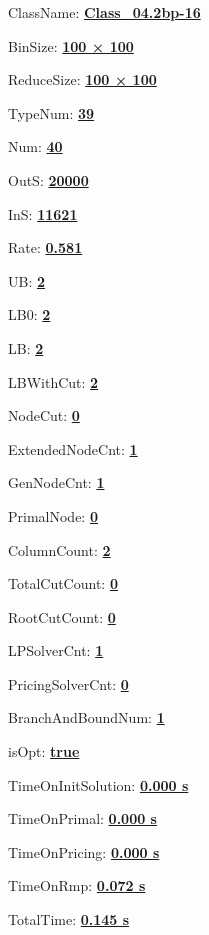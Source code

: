 \documentclass[11pt]{article}
\begin{document}
\pagestyle{empty}


ClassName: \underline{\textbf{Class_04.2bp-16}}
\par
BinSize: \underline{\textbf{100 × 100}}
\par
ReduceSize: \underline{\textbf{100 × 100}}
\par
TypeNum: \underline{\textbf{39}}
\par
Num: \underline{\textbf{40}}
\par
OutS: \underline{\textbf{20000}}
\par
InS: \underline{\textbf{11621}}
\par
Rate: \underline{\textbf{0.581}}
\par
UB: \underline{\textbf{2}}
\par
LB0: \underline{\textbf{2}}
\par
LB: \underline{\textbf{2}}
\par
LBWithCut: \underline{\textbf{2}}
\par
NodeCut: \underline{\textbf{0}}
\par
ExtendedNodeCnt: \underline{\textbf{1}}
\par
GenNodeCnt: \underline{\textbf{1}}
\par
PrimalNode: \underline{\textbf{0}}
\par
ColumnCount: \underline{\textbf{2}}
\par
TotalCutCount: \underline{\textbf{0}}
\par
RootCutCount: \underline{\textbf{0}}
\par
LPSolverCnt: \underline{\textbf{1}}
\par
PricingSolverCnt: \underline{\textbf{0}}
\par
BranchAndBoundNum: \underline{\textbf{1}}
\par
isOpt: \underline{\textbf{true}}
\par
TimeOnInitSolution: \underline{\textbf{0.000 s}}
\par
TimeOnPrimal: \underline{\textbf{0.000 s}}
\par
TimeOnPricing: \underline{\textbf{0.000 s}}
\par
TimeOnRmp: \underline{\textbf{0.072 s}}
\par
TotalTime: \underline{\textbf{0.145 s}}
\par
\newpage
\end{document}
